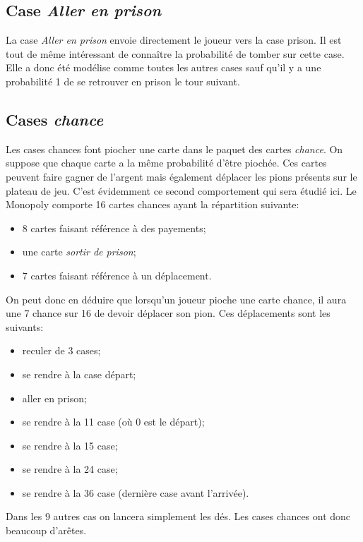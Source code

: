 \documentclass[letterpaper]{article}
\begin{document}
  \subsection{Case \textit{Aller en prison}}
    La case \textit{Aller en prison} envoie directement le joueur vers
    la case prison.  Il est tout de même intéressant de connaître la
    probabilité de tomber sur cette case.  Elle a donc été modélise
    comme toutes les autres cases sauf qu'il y a une probabilité 1
    de se retrouver en prison le tour suivant.
    
  \subsection{Cases \textit{chance}}
    Les cases chances font piocher une carte dans le paquet des
    cartes \textit{chance}.  On suppose que chaque carte a la 
    même probabilité d'être piochée. Ces cartes peuvent faire gagner de 
    l'argent mais également déplacer les pions présents sur le plateau 
    de jeu.  C'est évidemment ce second comportement qui sera étudié 
    ici.  Le Monopoly comporte 16 cartes chances ayant la répartition 
    suivante:
    \begin{itemize}
     \item 8 cartes faisant référence à des payements;
     \item une carte \textit{sortir de prison};
     \item 7 cartes faisant référence à un déplacement.
    \end{itemize}
    On peut donc en déduire que lorsqu'un joueur pioche une carte 
    chance, il aura une 7 chance sur 16 de devoir déplacer son pion.  
    Ces déplacements sont les suivants:
    \begin{itemize}
     \item reculer de 3 cases;
     \item se rendre à la case départ;
     \item aller en prison;
     \item se rendre à la 11 case (où 0 est le départ);
     \item se rendre à la 15 case;
     \item se rendre à la 24 case;
     \item se rendre à la 36 case (dernière case avant l'arrivée).
    \end{itemize}
    Dans les 9 autres cas on lancera simplement les dés.  Les cases 
    chances ont donc beaucoup d'arêtes.
    
\end{document}
